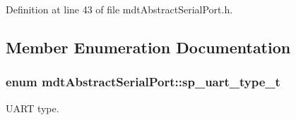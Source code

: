 Definition at line 43 of file mdt\-Abstract\-Serial\-Port.\-h.



\subsection{Member Enumeration Documentation}
\hypertarget{classmdt_abstract_serial_port_a56b107c57fb0acb17cfcca262abe6a54}{
\subsubsection[{sp\-\_\-uart\-\_\-type\-\_\-t}]{\setlength{\rightskip}{0pt plus 5cm}enum {\bf mdt\-Abstract\-Serial\-Port\-::sp\-\_\-uart\-\_\-type\-\_\-t}}}\label{classmdt_abstract_serial_port_a56b107c57fb0acb17cfcca262abe6a54}


U\-A\-R\-T type. 

